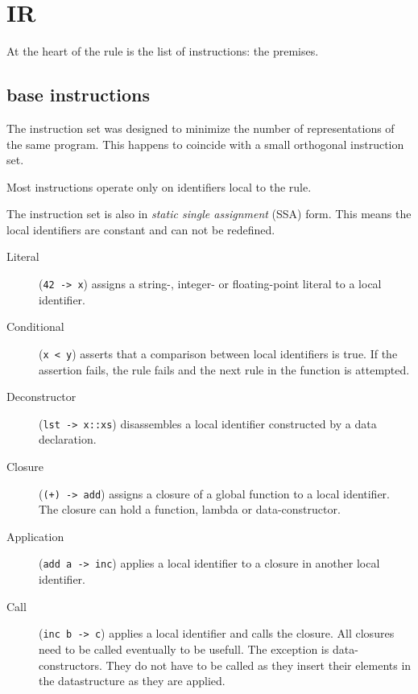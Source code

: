 \section{IR}
At the heart of the rule is the list of instructions: the premises.

\subsection{base instructions}
The instruction set was designed to minimize the number of representations of the same program.
This happens to coincide with a small orthogonal instruction set.


Most instructions operate only on identifiers local to the rule.

The instruction set is also in \textit{static single assignment} (SSA) form.
This means the local identifiers are constant and can not be redefined.

\begin{description}
\item[Literal] (\verb|42 -> x|) assigns a string-, integer- or floating-point literal to a local identifier.
\item[Conditional] (\verb|x < y|) asserts that a comparison between local identifiers is true.
    If the assertion fails, the rule fails and the next rule in the function is attempted.
\item[Deconstructor] (\verb|lst -> x::xs|) disassembles a local identifier constructed by a data declaration.
\item[Closure] (\verb|(+) -> add|) assigns a closure of a global function to a local identifier.
    The closure can hold a function, lambda or data-constructor.
\item[Application] (\verb|add a -> inc|) applies a local identifier to a closure in another local identifier.
\item[Call] (\verb|inc b -> c|) applies a local identifier and calls the closure.
    All closures need to be called eventually to be usefull.
    The exception is data-constructors. 
    They do not have to be called as they insert their elements in the datastructure as they are applied.
\end{description}

